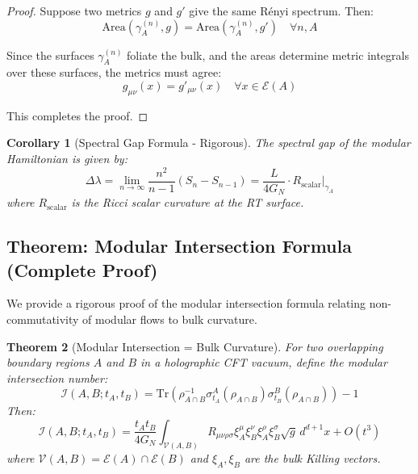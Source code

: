 \documentclass[12pt,a4paper]{article}
\newtheorem{theorem}{Theorem}[section]
\newtheorem{corollary}[theorem]{Corollary}
\begin{document}
\begin{proof}
Suppose two metrics $g$ and $g'$ give the same R\'enyi spectrum. Then:
\begin{equation}
\text{Area}(\gamma_A^{(n)}, g) = \text{Area}(\gamma_A^{(n)}, g') \quad \forall n, A
\end{equation}

Since the surfaces $\gamma_A^{(n)}$ foliate the bulk, and the areas determine metric integrals over these surfaces, the metrics must agree:
\begin{equation}
g_{\mu\nu}(x) = g'_{\mu\nu}(x) \quad \forall x \in \mathcal{E}(A)
\end{equation}

This completes the proof.
\end{proof}

\begin{corollary}[Spectral Gap Formula - Rigorous]
The spectral gap of the modular Hamiltonian is given by:
\begin{equation}
\Delta\lambda = \lim_{n \to \infty} \frac{n^2}{n-1}\left( S_n - S_{n-1} \right) = \frac{L}{4G_N} \cdot R_{\text{scalar}}|_{\gamma_A}
\end{equation}
where $R_{\text{scalar}}$ is the Ricci scalar curvature at the RT surface.
\end{corollary}

\subsection{Theorem: Modular Intersection Formula (Complete Proof)}

We provide a rigorous proof of the modular intersection formula relating non-commutativity of modular flows to bulk curvature.

\begin{theorem}[Modular Intersection = Bulk Curvature]\label{thm:modular-intersection}
For two overlapping boundary regions $A$ and $B$ in a holographic CFT vacuum, define the modular intersection number:
\begin{equation}
\mathcal{I}(A, B; t_A, t_B) = \text{Tr}\left( \rho_{A \cap B}^{-1} \sigma_{t_A}^A(\rho_{A \cap B}) \sigma_{t_B}^B(\rho_{A \cap B}) \right) - 1
\end{equation}
Then:
\begin{equation}
\mathcal{I}(A, B; t_A, t_B) = \frac{t_A t_B}{4G_N} \int_{\mathcal{V}(A,B)} R_{\mu\nu\rho\sigma} \xi_A^\mu \xi_B^\nu \xi_A^\rho \xi_B^\sigma \sqrt{g} \, d^{d+1}x + O(t^3)
\end{equation}
where $\mathcal{V}(A,B) = \mathcal{E}(A) \cap \mathcal{E}(B)$ and $\xi_A, \xi_B$ are the bulk Killing vectors.
\end{theorem}
\end{document}
